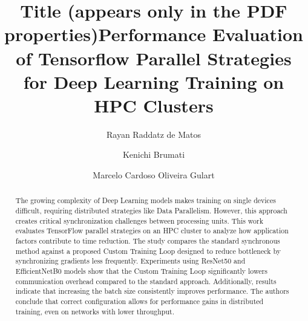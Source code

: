 \documentclass[format=acmsmall, review=false, screen=true]{acmart}
\date{}
\title{Title (appears only in the PDF properties)}
\begin{document}



\title[Performance Evaluation of Tensorflow Parallel Strategies]{Performance Evaluation of Tensorflow Parallel Strategies for Deep Learning Training on HPC Clusters}

\author{Rayan Raddatz de Matos}

\author{Kenichi Brumati}

\author{Marcelo Cardoso Oliveira Gulart}
\begin{abstract}

The growing complexity of Deep Learning models makes training on single devices difficult, requiring distributed strategies like Data Parallelism. However, this approach creates critical synchronization challenges between processing units. This work evaluates TensorFlow parallel strategies on an HPC cluster to analyze how application factors contribute to time reduction. The study compares the standard synchronous method against a proposed Custom Training Loop designed to reduce bottleneck by synchronizing gradients less frequently. Experiments using ResNet50 and EfficientNetB0 models show that the Custom Training Loop significantly lowers communication overhead compared to the standard approach. Additionally, results indicate that increasing the batch size consistently improves performance. The authors conclude that correct configuration allows for performance gains in distributed training, even on networks with lower throughput.

\end{abstract}

\maketitle
\end{document}
